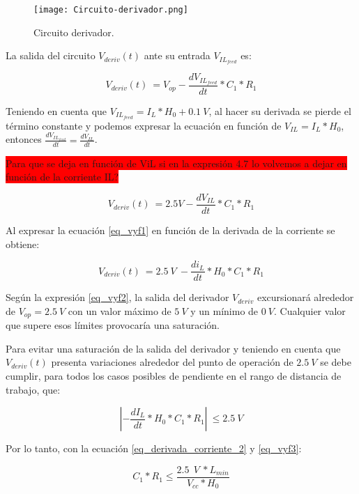 \begin{figure}[H]
	\centering
	\texttt{[image: Circuito-derivador.png]}
	\caption{Circuito derivador.}
	\label{fig:img_Circuito-derivador}
\end{figure}


La salida del circuito $V_{deriv}(t)$ ante su entrada $V_{IL_{feed}}$ es:

\begin{equation} 
	V_{deriv}(t)\ = V_{op} - \frac{dV_{IL_{feed}}}{dt}*C_1*R_1
\end{equation}

Teniendo en cuenta que $V_{IL_{feed}}=I_L*H_0+0.1\:V$, al hacer su derivada se pierde el término constante y podemos expresar la ecuación en función de $V_{IL}=I_L*H_0$, entonces $ \frac{dV_{IL_{feed}}}{dt}= \frac{dV_{IL}}{dt}$.

\colorbox{red}{Para que se deja en función de ViL si en la expresión 4.7 lo volvemos a dejar en función de la corriente IL?}

\begin{equation} \label{eq_vyf1}
	V_{deriv}(t)\ = 2.5V - \frac{dV_{IL}}{dt}*C_1*R_1
\end{equation}

Al expresar la ecuación \ref{eq_vyf1} en función de la derivada de la corriente se obtiene:

\begin{equation} \label{eq_vyf2}
	V_{deriv}(t)\ =2.5\:V\ -\frac{di_L}{dt}*H_0*C_1*R_1
\end{equation}

Según la expresión \ref{eq_vyf2}, la salida del derivador $V_{deriv}$ excursionará alrededor de $V_{op}=2.5\:V$ con un valor máximo de $5\:V$ y un mínimo de $0\:V$. Cualquier valor que supere esos límites provocaría una saturación.

Para evitar una saturación de la salida del derivador y teniendo en cuenta que $V_{deriv}(t)$ presenta variaciones alrededor del punto de operación de $2.5\:V$ se debe cumplir, para todos los casos posibles de pendiente en el rango de distancia de trabajo, que:

\begin{equation} \label{eq_vyf3}
	\left|-\frac{dI_L}{dt}*H_0*C_1*R_1\right|\ \le 2.5\:V
\end{equation}

Por lo tanto, con la ecuación \ref{eq_derivada_corriente_2} y \ref{eq_vyf3}:

\begin{equation} \label{eq_condicionC1-R1}
	C_1*R_1\le\frac{2.5\ \:V\ *L_{min}}{V_{cc}*H_0}
\end{equation}


